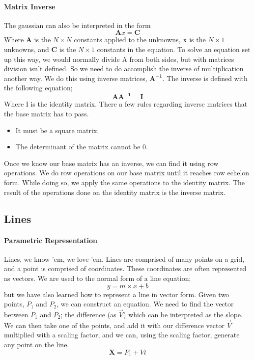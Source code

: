 \paragraph{Matrix Inverse} The gaussian can also be interpreted in the form \[\mathbf{A}x = \mathbf{C}\] Where \textbf{A} is the $N \times N$ constants applied to the unknowns, \textbf{x} is the $N \times 1$ unknowns, and \textbf{C} is the $N \times 1$ constants in the equation. To solve an equation set up this way, we would normally divide A from both sides, but with matrices division isn't defined. So we need to do accomplish the inverse of multiplication another way. We do this using inverse matrices, $\mathbf{A^{-1}}$.
\newline
The inverse is defined with the following equation; \[ \mathbf{A}\mathbf{A^{-1}} = \mathbf{I}\] Where I is the identity matrix. There a few rules regarding inverse matrices that the base matrix has to pass. 
\begin{itemize}
	\item It must be a square matrix.
	\item The determinant of the matrix cannot be 0.
\end{itemize}
Once we know our base matrix has an inverse, we can find it using row operations. We do row operations on our base matrix until it reaches row echelon form. While doing so, we apply the same operations to the identity matrix. The result of the operations done on the identity matrix is the inverse matrix.
\subsection{Lines}
\paragraph{Parametric Representation} Lines, we know 'em, we love 'em. Lines are comprised of many points on a grid, and a point is comprised of coordinates. These coordinates are often represented as vectors. We are used to the normal form of a line equation; \[ y = m \times x + b\] but we have also learned how to represent a line in vector form. Given two points, $P_1$ and $P_2$, we can construct an equation.  We need to find the vector between $P_1$ and $P_2$; the difference (as $\vec{V}$) which can be interpreted as the slope. We can then take one of the points, and add it with our difference vector $\vec{V}$ multiplied with a scaling factor, and we can, using the scaling factor, generate any point on the line. \[ \mathbf{X} = P_1 + Vt\]
